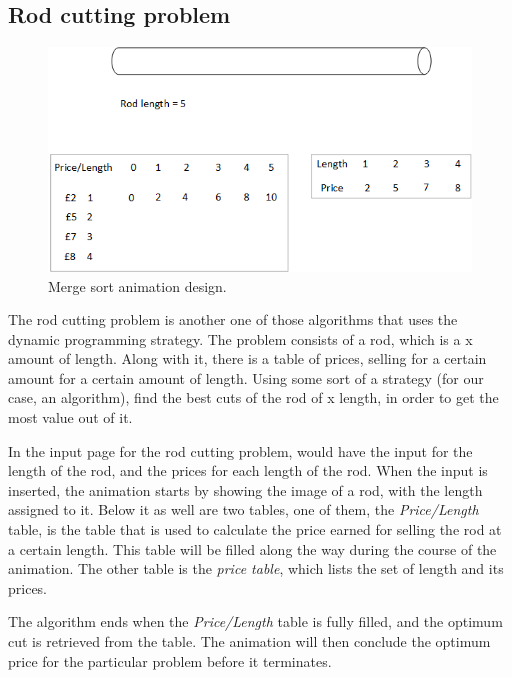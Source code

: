 \subsection{Rod cutting problem}

\begin{figure}[H]
\centering
\includegraphics[scale=0.9]{images/report_images/animationDesignRodCuttingProblem.png}
\caption{Merge sort animation design.}
\label{animationDesignRodCuttingProblem}
\end{figure}

The rod cutting problem is another one of those algorithms that uses the dynamic programming strategy. The problem consists of a rod, which is a x amount of length. Along with it, there is a table of prices, selling for a certain amount for a certain amount of length. Using some sort of a strategy (for our case, an algorithm), find the best cuts of the rod of x length, in order to get the most value out of it.

In the input page for the rod cutting problem, would have the input for the length of the rod, and the prices for each length of the rod. When the input is inserted, the animation starts by showing the image of a rod, with the length assigned to it. Below it as well are two tables, one of them, the \textit{Price/Length} table, is the table that is used to calculate the price earned for selling the rod at a certain length. This table will be filled along the way during the course of the animation. The other table is the \textit{price table}, which lists the set of length and its prices. 

The algorithm ends when the \textit{Price/Length} table is fully filled, and the optimum cut is retrieved from the table. The animation will then conclude the optimum price for the particular problem before it terminates.

